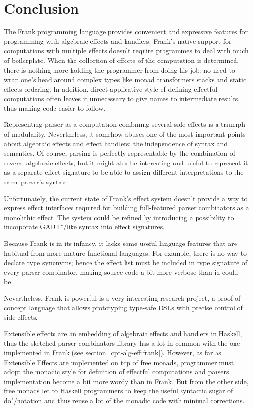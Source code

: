 \section{Conclusion}

The Frank programming language provides convenient and expressive features for programming with
algebraic effects and handlers. Frank's native support for computations with
multiple effects doesn't require programmes to deal with much of boilerplate.
When the collection of effects of the computation is determined, there is nothing
more holding the programmer from doing his job: no need to wrap one's head around
complex types like monad transformers stacks and static effects ordering.
In addition, direct applicative style of defining effectful computations often
leaves it unnecessary to give names to intermediate results, thus making code
easier to follow.

Representing parser as a computation combining several side effects is a
triumph of modularity. Nevertheless, it somehow abuses one of the most important
points about algebraic effects and effect handlers: the independence of
syntax and semantics. Of course, parsing is perfectly representable by the
combination of several algebraic effects, but it might also be interesting
and useful to represent it as a separate effect signature to be able to assign
different interpretations to the same parser's syntax.

Unfortunately, the current state of Frank's effect system doesn't provide a way
to express effect interfaces required for building full-featured parser combinators
as a monolithic effect. The system could be refined by introducing a possibility
to incorporate GADT"/like syntax into effect signatures.

Because Frank is in its infancy, it lacks some useful language features that
are habitual from more mature functional languages. For example, there is no
way to declare type synonyms; hence the
effect list must be included in type signature of every parser combinator, making
source code a bit more verbose than in could be.

Nevertheless, Frank is powerful is a very interesting research project, a
proof-of-concept language that allows prototyping type-safe DSLs with precise
control of side-effects.

Extensible effects are an embedding of algebraic effects and handlers in Haskell,
thus the sketched parser combinators library has a lot in common with the one
implemented in Frank (see section~\ref{cpt-alg-eff:frank}). However, as far as Extensible
Effects are implemented on top of free monads, programmer must adopt the monadic
style for definition of effectful computations and parsers implementation
become a bit more wordy than in Frank. But from the other side, free monads let
to Haskell programmers to keep the useful syntactic sugar of do"/notation and
thus reuse a lot of the monadic code with minimal corrections.

